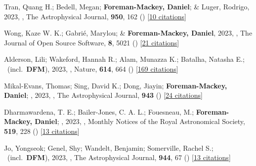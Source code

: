 \item[{\color{numcolor}\scriptsize95}] Tran, Quang H.; Bedell, Megan; \textbf{Foreman-Mackey, Daniel}; \& Luger, Rodrigo, 2023, , The Astrophysical Journal, \textbf{950}, 162 () [\href{https://ui.adsabs.harvard.edu/abs/2023ApJ...950..162T}{10 citations}]

\item[{\color{numcolor}\scriptsize94}] Wong, Kaze W. K.; Gabri{\'e}, Marylou; \& \textbf{Foreman-Mackey, Daniel}, 2023, , The Journal of Open Source Software, \textbf{8}, 5021 () [\href{https://ui.adsabs.harvard.edu/abs/2023JOSS....8.5021W}{21 citations}]

\item[{\color{numcolor}\scriptsize93}] Alderson, Lili; Wakeford, Hannah R.; Alam, Munazza K.; Batalha, Natasha E.; \etal\ (incl.\ \textbf{DFM}), 2023, , Nature, \textbf{614}, 664 () [\href{https://ui.adsabs.harvard.edu/abs/2023Natur.614..664A}{169 citations}]

\item[{\color{numcolor}\scriptsize92}] Mikal-Evans, Thomas; Sing, David K.; Dong, Jiayin; \textbf{Foreman-Mackey, Daniel}; \etal, 2023, , The Astrophysical Journal, \textbf{943} () [\href{https://ui.adsabs.harvard.edu/abs/2023ApJ...943L..17M}{24 citations}]

\item[{\color{numcolor}\scriptsize91}] Dharmawardena, T. E.; Bailer-Jones, C. A. L.; Fouesneau, M.; \textbf{Foreman-Mackey, Daniel}; \etal, 2023, , Monthly Notices of the Royal Astronomical Society, \textbf{519}, 228 () [\href{https://ui.adsabs.harvard.edu/abs/2023MNRAS.519..228D}{13 citations}]

\item[{\color{numcolor}\scriptsize90}] Jo, Yongseok; Genel, Shy; Wandelt, Benjamin; Somerville, Rachel S.; \etal\ (incl.\ \textbf{DFM}), 2023, , The Astrophysical Journal, \textbf{944}, 67 () [\href{https://ui.adsabs.harvard.edu/abs/2023ApJ...944...67J}{13 citations}]

